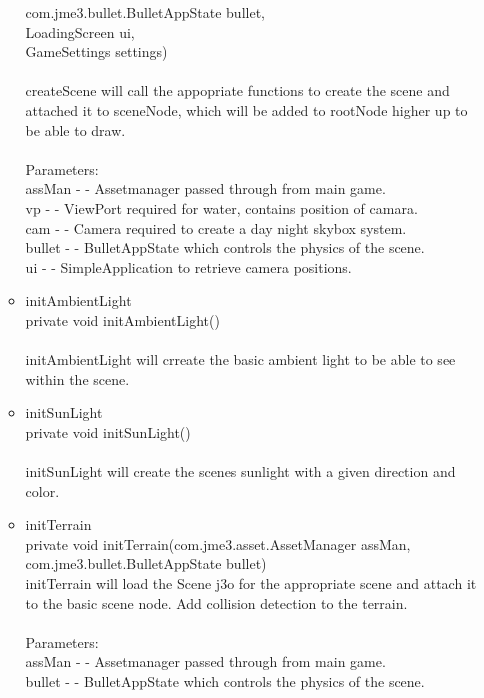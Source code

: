 \documentclass[letterpaper]{article}
\begin{document}
\begin{itemize}
\begin{itemize}
		               com.jme3.bullet.BulletAppState bullet, \\
		               LoadingScreen ui, \\
		               GameSettings settings) \\ \\
											createScene will call the appopriate functions to create the scene and attached it to sceneNode, which will be added to rootNode higher up to be able to draw. \\ \\
											Parameters: \\
											assMan - - Assetmanager passed through from main game. \\
											vp - - ViewPort required for water, contains position of camara. \\
											cam - - Camera required to create a day night skybox system. \\
											bullet - - BulletAppState which controls the physics of the scene. \\
											ui - - SimpleApplication to retrieve camera positions.
									\item	initAmbientLight \\
											private void initAmbientLight() \\ \\
											initAmbientLight will crreate the basic ambient light to be able to see within the scene.
									\item	initSunLight \\
											private void initSunLight() \\ \\
											initSunLight will create the scenes sunlight with a given direction and color.
									\item	initTerrain \\
											private void initTerrain(com.jme3.asset.AssetManager assMan, \\
		               com.jme3.bullet.BulletAppState bullet) \\
											initTerrain will load the Scene j3o for the appropriate scene and attach it to the basic scene node. Add collision detection to the terrain. \\ \\
											Parameters: \\
											assMan - - Assetmanager passed through from main game. \\
											bullet - - BulletAppState which controls the physics of the scene.

\end{itemize}
\end{itemize}
\end{document}
